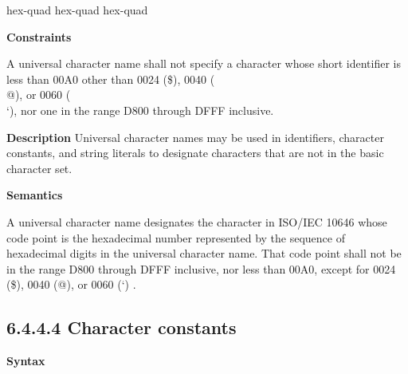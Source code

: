 \documentclass{wg21}
\begin{document}
\begin{bnf}
    \br
     hex-quad\br
     hex-quad hex-quad\br
\end{bnf}


\begin{removedblock}

\textbf{Constraints}

A universal character name shall not specify a character whose short identifier is less than 00A0
other than 0024 (\$), 0040 (\\@), or 0060 (\\‘), nor one in the range D800 through DFFF inclusive.

\end{removedblock}

\textbf{Description}
Universal character names may be used in identifiers, character constants, and string literals to
designate characters that are not in the basic character set.

\textbf{Semantics}


\begin{addedblock}
A universal character name designates the character in ISO/IEC 10646 whose code point is the hexadecimal number represented by the sequence of hexadecimal digits in the universal character name. That code point shall not be in the range D800 through DFFF inclusive, nor less than 00A0, except for 0024 (\$), 0040 (@), or 0060 (‘) .

\end{addedblock}



\subsection{6.4.4.4 Character constants}

\textbf{Syntax}
\end{document}
